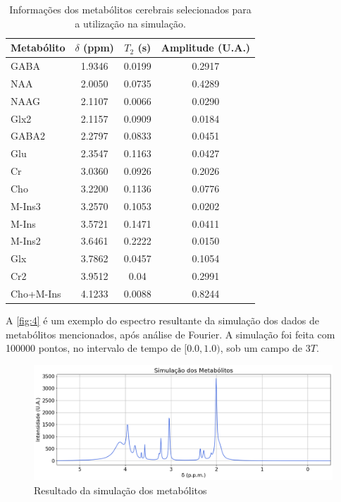 \documentclass[
12pt,		
twoside, 
a4paper,
chapter=TITLE,
english,			
brazil]{USPSC-classe/USPSC}
\begin{document}
\begin{table}[H] 
    \centering
    \begin{tabular}{|l|c|c|c|}
    \hline
    Metabólito & $\delta$ (ppm) & $T_2$ (s) & Amplitude (U.A.) \\
    \hline
    GABA & 1.9346 & 0.0199 & 0.2917 \\
    NAA & 2.0050 & 0.0735 & 0.4289 \\
    NAAG & 2.1107 & 0.0066 & 0.0290 \\
    Glx2 & 2.1157 & 0.0909 & 0.0184 \\
    GABA2 & 2.2797 & 0.0833 & 0.0451 \\
    Glu & 2.3547 & 0.1163 & 0.0427 \\
    Cr & 3.0360 & 0.0926 & 0.2026 \\
    Cho & 3.2200 & 0.1136 & 0.0776 \\
    M-Ins3 & 3.2570 & 0.1053 & 0.0202 \\
    M-Ins & 3.5721 & 0.1471 & 0.0411 \\
    M-Ins2 & 3.6461 & 0.2222 & 0.0150 \\
    Glx & 3.7862 & 0.0457 & 0.1054 \\
    Cr2 & 3.9512 & 0.04 & 0.2991 \\
    Cho+M-Ins & 4.1233 & 0.0088 & 0.8244 \\
    \hline
    \end{tabular}
    \caption{Informações dos metabólitos cerebrais selecionados para a utilização	na simulação.}
    \label{table:1}
\end{table}

A \autoref{fig:4} é um exemplo do espectro resultante da simulação dos dados de metabólitos mencionados, após análise de Fourier. A simulação foi feita com 100000 pontos,
no intervalo de tempo de $[0.0, 1.0)$, sob um campo de $3T$. 

\begin{figure} [H]
    \includegraphics[scale=0.37]{metabolites.png}
    \centering
    \caption{Resultado da simulação dos metabólitos}
    \label{fig:4}
\end{figure}
\end{document}
